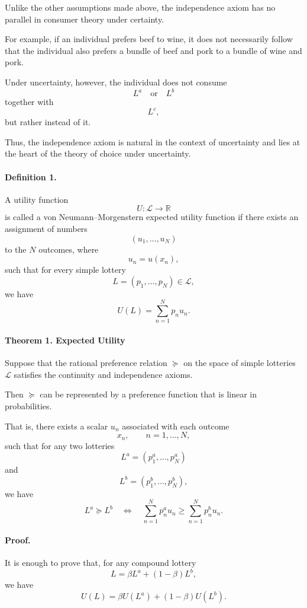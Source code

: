 Unlike the other assumptions made above, the independence axiom has no parallel in consumer theory under certainty.

For example, if an individual prefers beef to wine, it does not necessarily follow that the individual also prefers a bundle of beef and pork to a bundle of wine and pork.

Under uncertainty, however, the individual does not consume
\[
L^a
\quad\text{or}\quad
L^b
\]
together with
\[
L^c,
\]
but rather instead of it.

Thus, the independence axiom is natural in the context of uncertainty and lies at the heart of the theory of choice under uncertainty.

\paragraph{Definition 1.}

A utility function
\[
U:\mathcal{L}\to\mathbb{R}
\]
is called a von Neumann--Morgenstern expected utility function if there exists an assignment of numbers
\[
(u_1,\dots,u_N)
\]
to the \(N\) outcomes, where
\[
u_n=u(x_n),
\]
such that for every simple lottery
\[
L=(p_1,\dots,p_N)\in\mathcal{L},
\]
we have
\[
U(L)
=
\sum_{n=1}^N p_nu_n.
\]

\paragraph{Theorem 1. Expected Utility}

Suppose that the rational preference relation \(\succeq\) on the space of simple lotteries \(\mathcal{L}\) satisfies the continuity and independence axioms.

Then \(\succeq\) can be represented by a preference function that is linear in probabilities.

That is, there exists a scalar \(u_n\) associated with each outcome
\[
x_n,
\qquad
n=1,\dots,N,
\]
such that for any two lotteries
\[
L^a=(p_1^a,\dots,p_N^a)
\]
and
\[
L^b=(p_1^b,\dots,p_N^b),
\]
we have
\[
L^a\succeq L^b
\quad\Longleftrightarrow\quad
\sum_{n=1}^N p_n^a u_n
\ge
\sum_{n=1}^N p_n^b u_n.
\]



\paragraph{Proof.}
It is enough to prove that, for any compound lottery
\[
L=\beta L^a+(1-\beta)L^b,
\]
we have
\[
U(L)
=
\beta U(L^a)+(1-\beta)U(L^b).
\]

